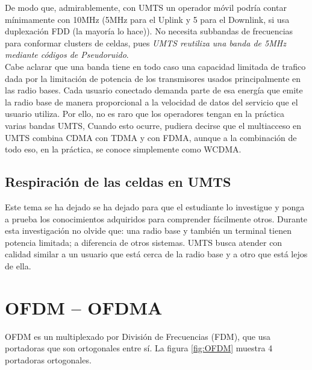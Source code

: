 De modo que, admirablemente, con UMTS un operador móvil podría contar mínimamente con 10MHz (5MHz para el Uplink y 5 para el Downlink, si usa duplexación FDD (la mayoría lo hace)). No necesita subbandas de frecuencias para conformar clusters de celdas, pues \textit{UMTS reutiliza una banda de 5MHz mediante códigos de Pseudoruido}. \\

Cabe aclarar que una banda tiene en todo caso una capacidad limitada de trafico dada por la limitación de potencia de los transmisores usados principalmente en las radio bases. Cada usuario conectado demanda parte de esa energía que emite la radio base de manera proporcional a la velocidad de datos del servicio que el usuario utiliza. Por ello, no es raro que los operadores tengan en la práctica varias bandas UMTS, Cuando esto ocurre, pudiera decirse que el multiacceso en UMTS combina CDMA con TDMA y con FDMA, aunque a la combinación de todo eso, en la práctica, se conoce simplemente como WCDMA. \\

\subsection{Respiración de las celdas en UMTS}

Este tema se ha dejado se ha dejado para que el estudiante lo investigue y ponga a prueba los conocimientos adquiridos para comprender fácilmente otros. Durante esta investigación no olvide que: una radio base y también un terminal tienen potencia limitada; a diferencia de otros sistemas. UMTS busca atender con calidad similar a un usuario que está cerca de la radio base y a otro que está lejos de ella.\\

\section{OFDM – OFDMA}

OFDM es un multiplexado por División de Frecuencias (FDM), que usa portadoras que son ortogonales entre sí. La figura \ref{fig:OFDM} muestra 4 portadoras ortogonales.\\

